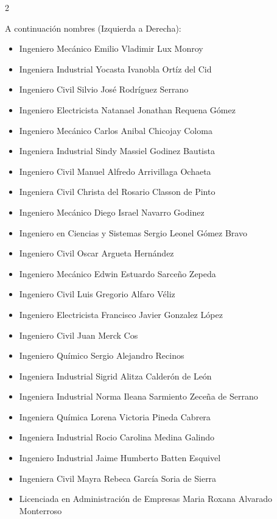 \documentclass[12pt,spanish,Letterpaper,openany]{book}
\providecommand{\tightlist}{%
  \setlength{\itemsep}{0pt}\setlength{\parskip}{0pt}}
\newcommand{\spacethreemilis}{\vspace{3mm}}
\newcommand{\spacetwomilis}{\vspace{2mm}}
\begin{document}
\begin {multicols}{2}

A continuación nombres (Izquierda a Derecha):
\spacethreemilis

\begin{itemize}
\tightlist
\item
  Ingeniero Mecánico Emilio Vladimir Lux Monroy
  \spacetwomilis
\item
  Ingeniera Industrial Yocasta Ivanobla Ortíz del Cid
  \spacetwomilis
\item
  Ingeniero Civil Silvio José Rodríguez Serrano
  \spacetwomilis
\item
  Ingeniero Electricista Natanael Jonathan Requena Gómez
  \spacetwomilis
\item
  Ingeniero Mecánico Carlos Anibal Chicojay Coloma
  \spacetwomilis
\item
  Ingeniera Industrial Sindy Massiel Godinez Bautista
  \spacetwomilis
\item
  Ingeniero Civil Manuel Alfredo Arrivillaga Ochaeta
  \spacetwomilis
\item
  Ingeniera Civil Christa del Rosario Classon de Pinto
  \spacetwomilis
\item
  Ingeniero Mecánico Diego Israel Navarro Godinez
  \spacetwomilis
\item
  Ingeniero en Ciencias y Sistemas Sergio Leonel Gómez Bravo
  \spacetwomilis
\item
  Ingeniero Civil Oscar Argueta Hernández
  \spacetwomilis
\item
  Ingeniero Mecánico Edwin Estuardo Sarceño Zepeda
  \spacetwomilis
\item
  Ingeniero Civil Luis Gregorio Alfaro Véliz
  \spacetwomilis
\item
  Ingeniero Electricista Francisco Javier Gonzalez López
  \spacetwomilis
\item
  Ingeniero Civil Juan Merck Cos
  \spacetwomilis
\item
  Ingeniero Químico Sergio Alejandro Recinos
  \spacetwomilis
\item
  Ingeniera Industrial Sigrid Alitza Calderón de León
  \spacetwomilis
\item
  Ingeniera Industrial Norma Ileana Sarmiento Zeceña de Serrano
  \spacetwomilis
\item
  Ingeniera Química Lorena Victoria Pineda Cabrera
  \spacetwomilis
\item
  Ingeniera Industrial Rocio Carolina Medina Galindo
  \spacetwomilis
\item
  Ingeniero Industrial Jaime Humberto Batten Esquivel
  \spacetwomilis
\item
  Ingeniera Civil Mayra Rebeca García Soria de Sierra
  \spacetwomilis
\item
  Licenciada en Administración de Empresas Maria Roxana Alvarado Monterroso
\end{itemize}

\end {multicols}
\end{document}
